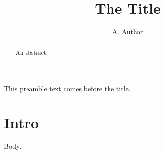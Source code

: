 \documentclass{article}
\title{The Title}
\author{A. Author}
\begin{document}
This preamble text comes before the title.
\maketitle
\begin{abstract}
An abstract.
\end{abstract}
\section{Intro}
Body.
\end{document}
